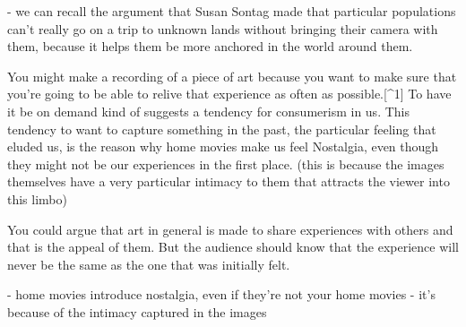 \documentclass[a4paper, 12pt]{article}
\begin{document}
- we can recall the argument that Susan Sontag made that particular populations can't really go on a trip to unknown lands without bringing their camera with them, because it helps them be more anchored in the world around them.

You might make a recording of a piece of art because you want to make sure that you're going to be able to relive that experience as often as possible.[^1] To have it be on demand kind of suggests a tendency for consumerism in us. This tendency to want to capture something in the past, the particular feeling that eluded us, is the reason why home movies make us feel Nostalgia, even though they might not be our experiences in the first place. (this is because the images themselves have a very particular intimacy to them that attracts the viewer into this limbo)

You could argue that art in general is made to share experiences with others and that is the appeal of them. But the audience should know that the experience will never be the same as the one that was initially felt.

- home movies introduce nostalgia, even if they're not your home movies
- it's because of the intimacy captured in the images
\end{document}
